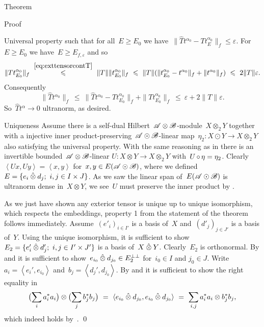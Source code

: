 \documentclass[b]{subfiles}
\begin{document}
\begin{parsec}
\begin{point}{Theorem}
\begin{point}{Proof}
\begin{point}{Universal property}
such that for all~$E \geq E_0$
we have~$\| \hat{T} t^{\alpha_0} -T t^{\alpha_0}_E \|_f \leq \varepsilon$.
For~$E \geq E_0$ we have~$E \geq E_{f,\varepsilon}$ and so
\begin{equation*}
 \|T t^{\alpha_0}_{E_0}\|_f
 \  \overset{\eqref{eq:exttensorcontT}}{\leq}\  \|T\| \|t^{\alpha_0}_{E_0}\|_f
  \  \leq\ \|T\|
  ( \|t^{\alpha_0}_{E_0} - t^{\alpha_0}\|_f +
  \| t^{\alpha_0} \|_f)
   \ \leq\  2 \|T\| \varepsilon.
\end{equation*}
    Consequently
\begin{equation*}
    \|\hat{T} t^{\alpha_0} \|_f \ \leq  \ 
    \|\hat{T} t^{\alpha_0} - T t^{\alpha_0}_{E_0} \|_f
                + \|T t^{\alpha_0}_{E_0}\|_f
    \ \leq\  \varepsilon + 2\|T\|\varepsilon.
\end{equation*}
So~$\hat{T}t^\alpha \to 0$ ultranorm, as desired.
\end{point}
\begin{point}{Uniqueness}%
Assume there is a self-dual Hilbert~$\scrA\otimes\scrB$-module~$X \otimes_2 Y$
    together with a injective
    inner product-preserving~$\scrA\odot\scrB$-linear
    map~$\eta_2 \colon X \odot Y \to X \otimes_2 Y$
    also satisfying the universal property.
With the same reasoning as in 
    there is an invertible bounded~$\scrA\otimes\scrB$-linear
    $U\colon X \otimes Y \to X \otimes_2 Y$
    with~$U \after \eta = \eta_2$.
Clearly~$\left<Ux, U y\right> = \left<x,y\right>$
    for~$x,y \in E (\scrA\odot\scrB)$,
    where we defined~$E = \{e_i \hotimes d_j; \ i,j \in I\times J\}$.
As we saw the linear span of~$E (\scrA\odot\scrB)$
    is ultranorm dense in~$X \otimes Y$,
    we see~$U$ must preserve the inner product by .
\end{point}
\begin{point}%
As we just have shown any exterior tensor is unique up to unique isomorphism,
    which respects the embeddings, property 1 from the statement
    of the theorem follows immediately.
Assume~$(e'_i)_{i \in I'}$ is a basis of~$X$
    and~$(d'_j)_{j \in J'}$ is a basis of~$Y$.
Using the unique isomorphism, it is sufficient to show
$E_2 =\{ e'_i \hotimes d'_j; \ i,j \in I'\times J'\}$
is a basis of~$X \hotimes Y$.
Clearly~$E_2$ is orthonormal.
By  and 
    it is sufficient to show~$e_{i_0} \hotimes d_{j_0} \in E_2^{\perp\perp}$
    for~$i_0 \in I$ and $j_0 \in J$.
Write~$a_i = \left<e_i',e_{i_0}\right>$
    and~$b_j = \left<d_j',d_{j_0}\right>$.
By  and 
it is sufficient to show the right equality in
    \begin{equation*}
        \bigl(\sum_i a_i^*a_i\bigr) \otimes \bigl(\sum_j b_j^*b_j\bigr) \ = \ 
    \langle e_{i_0}\hotimes d_{j_0}, e_{i_0}\hotimes d_{j_0}\rangle
    \ =\  \sum_{i,j} a_i^*a_i \otimes b_j^*b_j,
    \end{equation*}
    which indeed holds by~\TODO{prod states sep}. \qed
\end{point}
\end{point}
\end{point}


\end{parsec}
\end{document}
